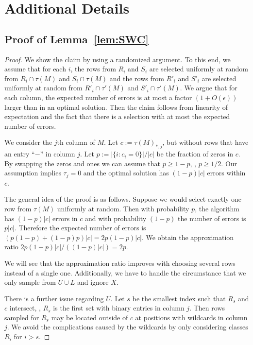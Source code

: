 \appendix
\appendixpage
\noappendicestocpagenum
\addappheadtotoc

\chapter{Additional Details}

\section{Proof of Lemma~\ref{lem:SWC}}\label{app:SWC}
\begin{proof}
    We show the claim by using a randomized argument. 
    To this end, we assume that for each $i$, the rows from $R_i$ and $S_i$ are selected uniformly at random from $R_i \cap \tau(M)$ and $S_i \cap \tau(M)$ and
    the rows from $R'_i$ and $S'_i$ are selected uniformly at random from $R'_i \cap \tau'(M)$ and $S'_i \cap \tau'(M)$.
    We argue that for each column, the expected number of errors is at most a factor $(1 + O(\epsilon))$ larger than in an optimal solution.
    Then the claim follows from linearity of expectation and the fact that there is a selection with at most the expected number of errors. 

    We consider the $j$th column of $M$.
    Let $c := \tau(M)_{*,j}$, but without rows that have an entry ``$-$'' in column $j$.
    Let $p := |\{ i : c_i = 0\}|/|c|$ be the fraction of zeros in $c$.
    By swapping the zeros and ones we can assume \WLOG that $p \ge 1-p$, \ie, $p \ge 1/2$.
    Our assumption implies $\tau_j = 0$ and the optimal solution has $(1-p)|c|$ errors within $c$.

    The general idea of the proof is as follows.
    Suppose we would select exactly one row from $\tau(M)$ uniformly at random.
    Then with probability $p$, the algorithm has $(1-p)|c|$ errors in $c$ and with probability $(1-p)$ the number of errors is $p|c|$.
    Therefore the expected number of errors is $(p(1-p) + (1-p)p) |c| = 2 p (1-p) |c|$.
    We obtain the approximation ratio $2 p (1-p) |c| / ((1-p)|c|) = 2 p$.

    We will see that the approximation ratio improves with choosing several rows instead of a single one.
    Additionally, we have to handle the circumstance that we only sample from $U \cup L$ and ignore $X$.

    There is a further issue regarding $U$.
    Let $s$ be the smallest index such that $R_s$ and $c$ intersect, \ie, $R_s$ is the first set with binary entries in column $j$.
    Then rows sampled for $R_s$ may be located outside of $c$ at positions with wildcards in column $j$.
    We avoid the complications caused by the wildcards by only considering classes $R_{i}$ for $i > s$.


\end{proof}
